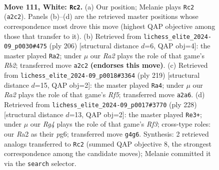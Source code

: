 \documentclass[11pt]{article}
\begin{document}
\clearpage

\begin{figure}[p]\centering
\begin{subfigure}{0.46\textwidth}\centering
\resizebox{\linewidth}{!}{%
\newchessgame
\chessboard[
  setfen={4k3/8/4p3/4P3/5PR1/8/R4K2/7r w - - 7 111},
  showmover=false,
  pgfstyle=straightmove, color=movearrow, markmove={a2-c2}
]}
\caption{}
\end{subfigure}\hfill
\begin{subfigure}{0.46\textwidth}\centering
\resizebox{\linewidth}{!}{%
\newchessgame
\chessboard[
  setfen={8/6k1/8/7p/7P/6P1/1R4K1/2r5 w - - 53 104},
  showmover=false,
  pgfstyle=straightmove, color=movearrow, markmove={b2-a2}
]}
\caption{}
\end{subfigure}
\\[4pt]
\begin{subfigure}{0.46\textwidth}\centering
\resizebox{\linewidth}{!}{%
\newchessgame
\chessboard[
  setfen={8/8/5kp1/7p/5r1P/8/4K3/7R b - - 81 110},
  showmover=false,
  pgfstyle=straightmove, color=movearrow, markmove={f4-a4}
]}
\caption{}
\end{subfigure}\hfill
\begin{subfigure}{0.46\textwidth}\centering
\resizebox{\linewidth}{!}{%
\newchessgame
\chessboard[
  setfen={8/r7/4k1p1/7p/7P/5RP1/8/6K1 w - - 66 115},
  showmover=false,
  pgfstyle=straightmove, color=movearrow, markmove={f3-e3}
]}
\caption{}
\end{subfigure}
\caption{\textbf{Move 111, White: \texttt{Rc2}.} (a) Our position; Melanie plays \texttt{Rc2} (\texttt{a2c2}). Panels (b)--(d) are the retrieved master positions whose correspondence most drove this move (highest QAP objective among those that transfer to it). (b) Retrieved from \texttt{lichess\_elite\_2024-09\_p0030\#475} (ply 206) [structural distance $d$=6, QAP obj=4]: the master played \texttt{Ra2}; under $\mu$ our \emph{Ra2} plays the role of that game's \emph{Rb2}; transferred move \texttt{a2c2} \textbf{(endorses this move)}. (c) Retrieved from \texttt{lichess\_elite\_2024-09\_p0018\#3364} (ply 219) [structural distance $d$=15, QAP obj=2]: the master played \texttt{Ra4}; under $\mu$ our \emph{Ra2} plays the role of that game's \emph{Rf5}; transferred move \texttt{a2a6}. (d) Retrieved from \texttt{lichess\_elite\_2024-09\_p0017\#3770} (ply 228) [structural distance $d$=13, QAP obj=2]: the master played \texttt{Re3+}; under $\mu$ our \emph{Rg4} plays the role of that game's \emph{Rf3}; cross-type roles: our \emph{R}a2 as their \emph{p}g6; transferred move \texttt{g4g6}. Synthesis: 2 retrieved analogs transferred to \texttt{Rc2} (summed QAP objective 8, the strongest correspondence among the candidate moves); Melanie committed it via the \texttt{search} selector.}
\label{fig:thought-m220}
\end{figure}
\end{document}
